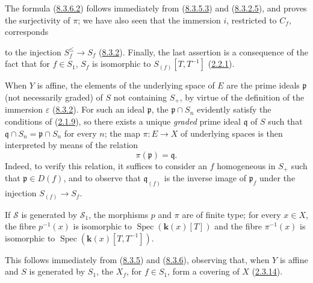 The formula (\hyperref[II.8.3.6.2]{8.3.6.2}) follows immediately from
(\hyperref[II.8.3.5.3]{8.3.5.3}) and
(\hyperref[II.8.3.2.5]{8.3.2.5}), and proves the surjectivity of $\pi$; we
have also seen that the immersion $i$, restricted to $C_f$, corresponds

to the injection $S_f^{\leq}\to S_f$ (\hyperref[II.8.3.2]{8.3.2}). Finally, the
last assertion is a consequence of the fact that for $f\in S_1$, $S_f$ is
isomorphic to $S_{(f)}[T,T^{-1}]$ (\hyperref[II.2.2.1]{2.2.1}).

\begin{remark}[8.3.7]
\label{II.8.3.7}
When $Y$ is affine, the elements of the underlying space of $E$ are the
prime ideals $\mathfrak{p}$ (not necessarily graded) of $S$ not
containing $S_+$, by virtue of the definition of the immersion $\varepsilon$
(\hyperref[II.8.3.2]{8.3.2}). For such an ideal $\mathfrak{p}$, the
$\mathfrak{p}\cap S_n$ evidently satisfy the conditions of
(\hyperref[II.2.1.9]{2.1.9}), so there exists a unique \emph{graded} prime
ideal $\mathfrak{q}$ of $S$ such that
$\mathfrak{q}\cap S_n=\mathfrak{p}\cap S_n$ for every $n$; the map
$\pi:E\to X$ of underlying spaces is then interpreted by means of the relation
\begin{equation}
\label{II.8.3.7.1}
  \pi(\mathfrak{p})=\mathfrak{q}.
\tag{8.3.7.1}
\end{equation}
Indeed, to verify this relation, it suffices to consider an $f$
homogeneous in $S_+$ such that $\mathfrak{p}\in D(f)$, and to observe that
$\mathfrak{q}_{(f)}$ is the inverse image of $\mathfrak{p}_f$ under
the injection $S_{(f)}\to S_f$.
\end{remark}

\begin{corollary}[8.3.8]
\label{II.8.3.8}
If $\mathcal{S}$ is generated by $\mathcal{S}_1$, the morphisms $p$ and
$\pi$ are of finite type; for every $x\in X$, the fibre $p^{-1}(x)$ is
isomorphic to $\operatorname{Spec}(\boldsymbol{k}(x)[T])$ and the fibre $\pi^{-1}(x)$ is
isomorphic to $\operatorname{Spec}(\boldsymbol{k}(x)[T,T^{-1}])$.
\end{corollary}

This follows immediately from (\hyperref[II.8.3.5]{8.3.5}) and
(\hyperref[II.8.3.6]{8.3.6}), observing that, when $Y$ is affine and
$S$ is generated by $S_1$, the $X_f$, for $f\in S_1$, form a covering
of $X$ (\hyperref[II.2.3.14]{2.3.14}).

